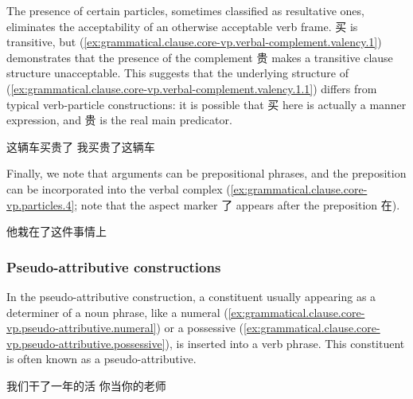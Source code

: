 \documentclass[UTF8, a4paper, oneside, scheme=plain, 12pt]{ctexrep}
\begin{document}
The presence of certain particles, sometimes classified as resultative ones,
eliminates the acceptability of an otherwise acceptable verb frame.
买 is transitive, but (\ref{ex:grammatical.clause.core-vp.verbal-complement.valency.1})
demonstrates that the presence of the complement 贵 makes 
a transitive clause structure unacceptable.
This suggests that the underlying structure of (\ref{ex:grammatical.clause.core-vp.verbal-complement.valency.1.1})
differs from typical verb-particle constructions:
it is possible that 买 here is actually a manner expression,
and 贵 is the real main predicator.

\begin{exe}
    \ex\label{ex:grammatical.clause.core-vp.verbal-complement.valency.1} 
    \begin{xlist}
        \ex\label{ex:grammatical.clause.core-vp.verbal-complement.valency.1.1} 这辆车买贵了
        \ex *我买贵了这辆车
    \end{xlist}
\end{exe}

Finally, we note that arguments can be prepositional phrases,
and the preposition can be incorporated into the verbal complex
(\ref{ex:grammatical.clause.core-vp.particles.4};
note that the aspect marker 了 appears after the preposition 在).

\begin{exe}
    \ex\label{ex:grammatical.clause.core-vp.particles.4} 他栽在了这件事情上
\end{exe}

\subsubsection{Pseudo-attributive constructions}\label{sec:grammatical.clause.core-vp.pseudo-attributive}

In the pseudo-attributive construction,
a constituent usually appearing as a determiner of a noun phrase, 
like a numeral (\ref{ex:grammatical.clause.core-vp.pseudo-attributive.numeral})
or a possessive (\ref{ex:grammatical.clause.core-vp.pseudo-attributive.possessive}),
is inserted into a verb phrase.
This constituent is often known as a pseudo-attributive.

\begin{exe}
    \ex\label{ex:grammatical.clause.core-vp.pseudo-attributive.numeral} 我们干了一年的活
    \ex\label{ex:grammatical.clause.core-vp.pseudo-attributive.possessive} 你当你的老师
\end{exe}
\end{document}
